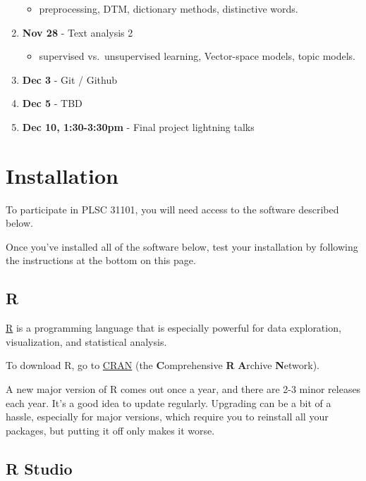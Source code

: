 \documentclass[]{book}
\providecommand{\tightlist}{%
  \setlength{\itemsep}{0pt}\setlength{\parskip}{0pt}}
\begin{document}
\begin{enumerate}
  \begin{itemize}
  \tightlist
  \item
    preprocessing, DTM, dictionary methods, distinctive words.
  \end{itemize}
\item
  \textbf{Nov 28} - Text analysis 2

  \begin{itemize}
  \tightlist
  \item
    supervised vs.~unsupervised learning, Vector-space models, topic
    models.
  \end{itemize}
\item
  \textbf{Dec 3} - Git / Github
\item
  \textbf{Dec 5} - TBD
\item
  \textbf{Dec 10, 1:30-3:30pm} - Final project lightning talks
\end{enumerate}

\chapter{Installation}\label{installation}

To participate in PLSC 31101, you will need access to the software
described below.

Once you've installed all of the software below, test your installation
by following the instructions at the bottom on this page.

\section{R}\label{r}

\href{http://www.r-project.org/}{R} is a programming language that is
especially powerful for data exploration, visualization, and statistical
analysis.

To download R, go to \href{https://cran.r-project.org/}{CRAN} (the
\textbf{C}omprehensive \textbf{R} \textbf{A}rchive \textbf{N}etwork).

A new major version of R comes out once a year, and there are 2-3 minor
releases each year. It's a good idea to update regularly. Upgrading can
be a bit of a hassle, especially for major versions, which require you
to reinstall all your packages, but putting it off only makes it worse.

\section{R Studio}\label{r-studio}
\end{document}
